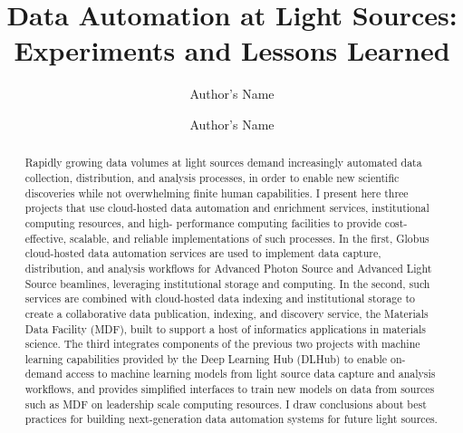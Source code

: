 \documentclass{aip-cp}
\newcommand\ian[1]{}
\newcommand\ian[1]{{\color{red}[Ian: #1]}}
\begin{document}
\title{Data Automation at Light Sources:\\Experiments and Lessons Learned\ian{more exciting title needed}}

\author[aff1,aff2]{Author's Name}
\author[aff2]{Author's Name}


\maketitle


\begin{abstract}
Rapidly growing data volumes at light sources demand increasingly automated data collection, distribution, and analysis processes, in order to enable new scientific discoveries while not overwhelming finite human capabilities. I present here three projects that use cloud-hosted data automation and enrichment services, institutional computing resources, and high- performance computing facilities to provide cost-effective, scalable, and reliable implementations of such processes. In the first, Globus cloud-hosted data automation services are used to implement data capture, distribution, and analysis workflows for Advanced Photon Source and Advanced Light Source beamlines, leveraging institutional storage and computing. In the second, such services are combined with cloud-hosted data indexing and institutional storage to create a collaborative data publication, indexing, and discovery service, the Materials Data Facility (MDF), built to support a host of informatics applications in materials science. The third integrates components of the previous two projects with machine learning capabilities provided by the Deep Learning Hub (DLHub) to enable on-demand access to machine learning models from light source data capture and analysis workflows, and provides simplified interfaces to train new models on data from sources such as MDF on leadership scale computing resources. I draw conclusions about best practices for building next-generation data automation systems for future light sources.
\end{abstract}
\end{document}

